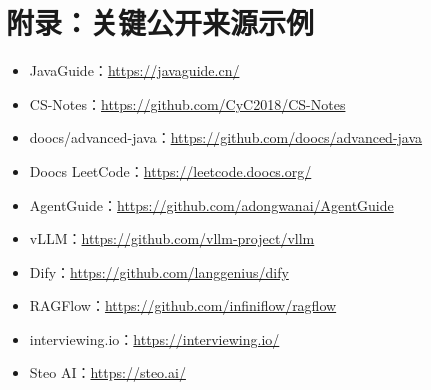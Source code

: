 \documentclass[UTF8,11pt]{ctexart}
\begin{document}
\section{附录：关键公开来源示例}
\begin{itemize}
\item JavaGuide：\url{https://javaguide.cn/}
\item CS-Notes：\url{https://github.com/CyC2018/CS-Notes}
\item doocs/advanced-java：\url{https://github.com/doocs/advanced-java}
\item Doocs LeetCode：\url{https://leetcode.doocs.org/}
\item AgentGuide：\url{https://github.com/adongwanai/AgentGuide}
\item vLLM：\url{https://github.com/vllm-project/vllm}
\item Dify：\url{https://github.com/langgenius/dify}
\item RAGFlow：\url{https://github.com/infiniflow/ragflow}
\item interviewing.io：\url{https://interviewing.io/}
\item Steo AI：\url{https://steo.ai/}
\end{itemize}
\end{document}
